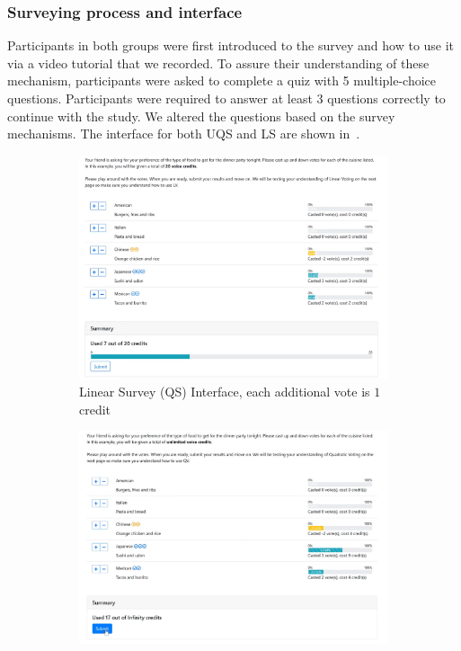 \subsubsection{Surveying process and interface}
Participants in both groups were first introduced to the survey and how to use it via a video tutorial that we recorded. To assure their understanding of these mechanism, participants were asked to complete a quiz with 5 multiple-choice questions. Participants were required to answer at least 3 questions correctly to continue with the study. We altered the questions based on the survey mechanisms. The interface for both UQS and LS are shown in~.


\begin{figure}
    \centering
    \begin{subfigure}{0.47\textwidth}
        \centering
        \includegraphics[width=\textwidth]{content/image/linear.png}
        \caption{Linear Survey (QS) Interface, each additional vote is $1$ credit}
        \label{fig:qs_interface}
    \end{subfigure}
    \hfill
    \begin{subfigure}{0.47\textwidth}
        \centering
        \includegraphics[width=\textwidth]{content/image/uqs.png}

\end{subfigure}
\end{figure}
